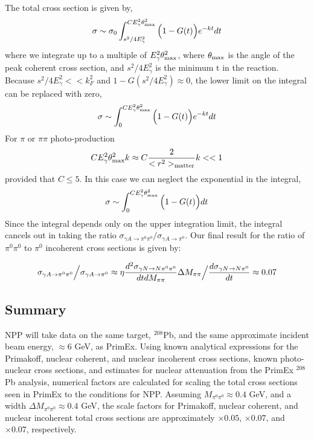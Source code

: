 The total cross section is given by, 
$$\sigma \sim \sigma_0 \int^{C E^2_\gamma \theta^2_{\rm max}}_{s^2/4E^2_\gamma} \Big( 1 - G(t) \Big) e^{-kt} dt  $$
where we integrate up to a multiple of $E_\gamma^2 \theta_{\rm max}^2$, where $\theta_{\rm max}$  is the angle of the peak coherent cross section, and $s^2/4E^2_\gamma$ is the minimum t in the reaction.  
Because $s^2/4E^2_\gamma << k^2_F$ and $1-G(s^2/4E^2_\gamma) \approx 0$, the lower limit on the integral can be replaced with zero, 
$$\sigma \sim \int^{CE^2_\gamma \theta^2_{\rm max}}_0 \Big( 1 - G(t) \Big) e^{-kt}  dt $$
For $\pi$ or $\pi \pi$ photo-production 
$$ C  E^2_\gamma \theta^2_{\rm max} k \approx C  { 2 \over <r^2>_{\rm matter} } k << 1 $$
provided that $C \le 5$. In this case we can neglect the exponential in the integral, 
$$\sigma \sim \int^{C E^2_\gamma \theta^2_{\rm max}}_0 \Big( 1 - G(t) \Big) dt $$
Since the integral depends only on the upper integration limit,   the integral  cancels out in taking the ratio $ \sigma_{\gamma A \rightarrow  \pi^0 \pi^0}  \Big/ \sigma_{\gamma A \rightarrow  \pi^0} $. 
Our final result for the ratio of  $\pi^0 \pi^0$ to $\pi^0$ incoherent cross sections is given by: 

$$  \sigma_{\gamma A \rightarrow  \pi^0 \pi^0}  \Big/ \sigma_{\gamma A \rightarrow  \pi^0}  \approx \eta 
 {d^2\sigma_{\gamma N \rightarrow N \pi^0 \pi^0} \over dt dM_{\pi \pi} }  \Delta M_{\pi \pi}\Big/ { d\sigma_{\gamma N \rightarrow N \pi^0} \over dt} \approx 0.07 $$

\subsection{Summary}
NPP will take data on the same target, $^{208}$Pb, and the same approximate incident beam energy, $\approx 6$ GeV, as PrimEx. Using known analytical expressions for the Primakoff, nuclear coherent, and nuclear incoherent cross sections, known photo-nuclear cross sections, and estimates for nuclear attenuation from the PrimEx $^{208}$Pb analysis, numerical factors are calculated for scaling the total cross sections seen in PrimEx to the 
conditions for NPP.  Assuming $M_{\pi^0 \pi^0} \approx 0.4$ GeV, and a width  $\Delta M_{\pi^0 \pi^0} \approx 0.4$ GeV, the scale factors for Primakoff, nuclear coherent, and nuclear incoherent total cross sections are approximately $\times 0.05$, $\times 0.07$, and $\times 0.07$, respectively. 

